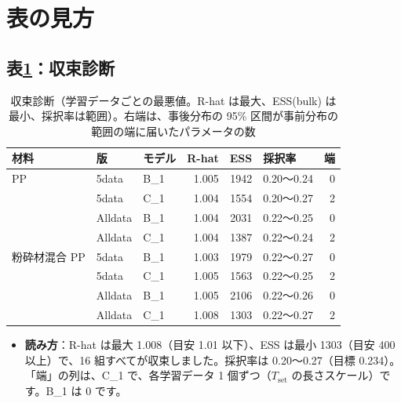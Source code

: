 \documentclass[paper=a4paper,fontsize=10.5pt,line_length=44zw,number_of_lines=38]{jlreq}
\newcommand{\Tset}{T_{\mathrm{set}}}
\newenvironment{points}{\begin{itemize}[label=$\triangleright$,leftmargin=1.5\zw,itemsep=0.3ex,topsep=0.5ex,parsep=0pt]}{\end{itemize}}
\newcommand{\pt}[1]{\item \textbf{#1}：}
\begin{document}
\section{表の見方}


\subsection{表\ref{tab:conv}：収束診断}
\begin{table}[H]
\caption{収束診断（学習データごとの最悪値。R-hat は最大、ESS(bulk) は最小、採択率は範囲）。右端は、事後分布の 95\% 区間が事前分布の範囲の端に届いたパラメータの数}\label{tab:conv}
\small
\begin{tabularx}{\linewidth}{@{}lllrrXr@{}}
\toprule
材料 & 版 & モデル & R-hat & ESS & 採択率 & 端 \\
\midrule
PP & 5data & B\_1 & 1.005 & 1942 & 0.20〜0.24 & 0 \\
 & 5data & C\_1 & 1.004 & 1554 & 0.20〜0.27 & 2 \\
 & Alldata & B\_1 & 1.004 & 2031 & 0.22〜0.25 & 0 \\
 & Alldata & C\_1 & 1.004 & 1387 & 0.22〜0.24 & 2 \\
粉砕材混合 PP & 5data & B\_1 & 1.003 & 1979 & 0.22〜0.27 & 0 \\
 & 5data & C\_1 & 1.005 & 1563 & 0.22〜0.25 & 2 \\
 & Alldata & B\_1 & 1.005 & 2106 & 0.22〜0.26 & 0 \\
 & Alldata & C\_1 & 1.008 & 1303 & 0.22〜0.27 & 2 \\
\bottomrule
\end{tabularx}
\end{table}
\begin{points}
\pt{読み方}R-hat は最大 1.008（目安 1.01 以下）、ESS は最小 1303（目安 400 以上）で、16 組すべてが収束しました。採択率は 0.20〜0.27（目標 0.234）。「端」の列は、C\_1 で、各学習データ 1 個ずつ（$\Tset$ の長さスケール）です。B\_1 は 0 です。
\end{points}
\end{document}
